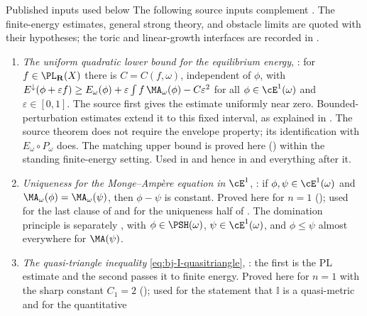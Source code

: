 \begin{important}{Published inputs used below}
\label{imp:ch47-imported}
The following source inputs complement
. The finite-energy
estimates, general strong theory, and obstacle limits are quoted with
their hypotheses; the toric and linear-growth interfaces are recorded in
.
\begin{enumerate}
\item\label{itm:ch47-import:diff}
      \emph{The uniform quadratic lower bound for the equilibrium energy},
      \cite[Theorem~8.5]{BJ22}: for $f\in\PL_{\mathbf R}(X)$ there is
      $C=C(f,\omega)$, independent of $\phi$, with
      $E^\downarrow(\phi+\varepsilon f)\ge
      E_\omega(\phi)+\varepsilon\int f\,\MA_\omega(\phi)-C\varepsilon^2$
      for all $\phi\in\cE^1(\omega)$ and $\varepsilon\in[0,1]$.
      The source first gives the estimate uniformly near zero.
      Bounded-perturbation estimates extend it to this fixed interval,
      as explained in .
      The source theorem does not require the envelope property;
      its identification with $E_\omega\circ P_\omega$ does.
      The matching upper bound is proved here
      () within the standing finite-energy setting.
      Used in  and hence in
       and everything after it.
\item\label{itm:ch47-import:uniqueness}
      \emph{Uniqueness for the Monge--Amp\`ere equation in $\cE^1$},
      \cite[Corollary~10.4]{BJ22}: if $\phi,\psi\in\cE^1(\omega)$ and
      $\MA_\omega(\phi)=\MA_\omega(\psi)$, then $\phi-\psi$ is
      constant.  Proved here for $n=1$
      (); used for the last clause of
       and for the uniqueness half of
      . The domination principle is separately
      \cite[Corollary~10.6]{BJ22}, with
      $\phi\in\PSH(\omega)$, $\psi\in\cE^1(\omega)$, and
      $\phi\le\psi$ almost everywhere for $\MA(\psi)$.
\item\label{itm:ch47-import:quasitriangle}
      \emph{The quasi-triangle inequality} \eqref{eq:bj-I-quasitriangle},
      \cite[Theorem~3.31 and Proposition~7.27]{BJ22}: the first is the
      PL estimate and the second passes it to finite energy.
      Proved here for $n=1$ with the sharp
      constant $C_1=2$ (); used for the
      statement that $\mathbb I$ is a quasi-metric and for the quantitative

\end{enumerate}
\end{important}
